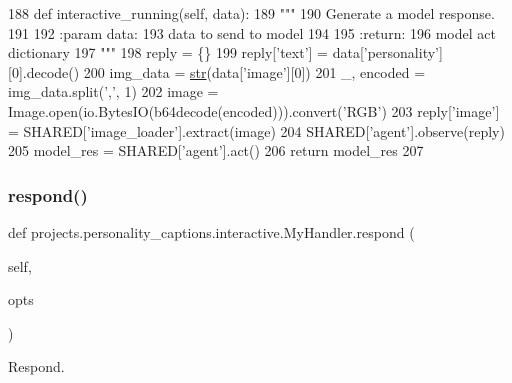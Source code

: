 \begin{DoxyCode}
188     \textcolor{keyword}{def }interactive\_running(self, data):
189         \textcolor{stringliteral}{"""}
190 \textcolor{stringliteral}{        Generate a model response.}
191 \textcolor{stringliteral}{}
192 \textcolor{stringliteral}{        :param data:}
193 \textcolor{stringliteral}{            data to send to model}
194 \textcolor{stringliteral}{}
195 \textcolor{stringliteral}{        :return:}
196 \textcolor{stringliteral}{            model act dictionary}
197 \textcolor{stringliteral}{        """}
198         reply = \{\}
199         reply[\textcolor{stringliteral}{'text'}] = data[\textcolor{stringliteral}{'personality'}][0].decode()
200         img\_data = \hyperlink{namespacegenerate__task__READMEs_a5b88452ffb87b78c8c85ececebafc09f}{str}(data[\textcolor{stringliteral}{'image'}][0])
201         \_, encoded = img\_data.split(\textcolor{stringliteral}{','}, 1)
202         image = Image.open(io.BytesIO(b64decode(encoded))).convert(\textcolor{stringliteral}{'RGB'})
203         reply[\textcolor{stringliteral}{'image'}] = SHARED[\textcolor{stringliteral}{'image\_loader'}].extract(image)
204         SHARED[\textcolor{stringliteral}{'agent'}].observe(reply)
205         model\_res = SHARED[\textcolor{stringliteral}{'agent'}].act()
206         \textcolor{keywordflow}{return} model\_res
207 
\end{DoxyCode}
\mbox{\label{classprojects_1_1personality__captions_1_1interactive_1_1MyHandler_a990c770086f0596dde94fc2a84e76d90}} 
\subsubsection{\texorpdfstring{respond()}{respond()}}
{\footnotesize\ttfamily def projects.\+personality\+\_\+captions.\+interactive.\+My\+Handler.\+respond (\begin{DoxyParamCaption}\item[{}]{self,  }\item[{}]{opts }\end{DoxyParamCaption})}

\begin{DoxyVerb}Respond.
\end{DoxyVerb}
 

